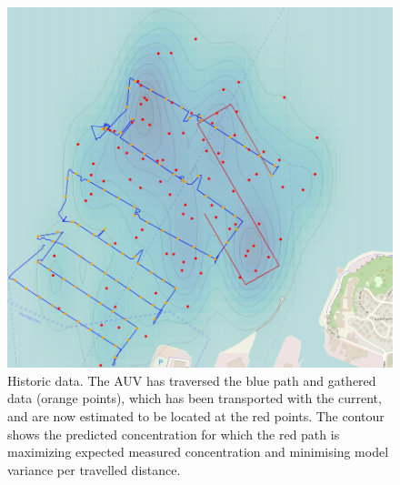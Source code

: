 \documentclass[conference]{IEEEtran}
\begin{document}
\begin{figure}[htbp]
  \centering
  \includegraphics[width=\linewidth]{figures/munkholmen_planned_path.png}
  \caption{Historic data. The AUV has traversed the blue path and gathered data (orange points), which has been transported with the current, and are now
    estimated to be located at the red points.  The contour shows the
    predicted concentration for which the red path is maximizing
    expected measured concentration and minimising model variance per travelled distance.}
  \label{fig:munkholmen}
\end{figure}
\end{document}
